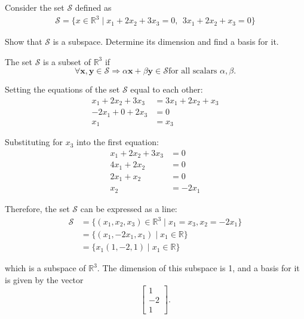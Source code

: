 \begin{homeworkProblem}


    Consider the set $\mathcal S$ defined as
    \[
        \begin{split}
            \mathcal S=\{x\in\mathbb R^3 \;|\; x_1+2x_2+3x_3=0, \ \  3x_1+2x_2+x_3=0\}
        \end{split}
    \]

    Show that $\mathcal S$ is a subspace. Determine its dimension and find a basis for it.
    \\

    \begin{solution}
        The set $\mathcal{S}$ is a subset of $\mathbb{R}^3$ if
        $$\forall \boldsymbol{x}, \boldsymbol{y} \in \mathcal{S} \Rightarrow \alpha 
        \boldsymbol{x} + \beta \boldsymbol{y} \in \mathcal{S} \text{for all scalars }
        \alpha, \beta \text{.}$$

        Setting the equations of the set $\mathcal{S}$ equal to each other:
        \[
            \begin{aligned}
                x_1 + 2x_2 + 3x_3 &= 3x_1 + 2x_2 + x_3 \\
                -2x_1 + 0 + 2x_3 &= 0 \\
                x_1 &= x_3
            \end{aligned}
        \]

        Substituting for \(x_3\) into the first equation:
        \[
            \begin{aligned}
                x_1 + 2x_2 + 3x_3 &= 0 \\
                4x_1 + 2x_2 &= 0 \\
                2x_1 + x_2 &= 0 \\
                x_2 &= -2x_1
            \end{aligned}
        \]

        Therefore, the set $\mathcal{S}$ can be expressed as a line:
        \[
            \begin{aligned}
                \mathcal{S} &= \{(x_1, x_2, x_3) \in \mathbb{R}^3 \mid x_1 = x_3, x_2 = -2x_1\} \\
                &= \{(x_1, -2x_1, x_1) \mid x_1 \in \mathbb{R}\} \\
                &= \{x_1(1, -2, 1) \mid x_1 \in \mathbb{R}\}
            \end{aligned}
        \]

        which is a subspace of $\mathbb{R}^3$. The dimension of this subspace is 1, 
        and a basis for it is given by the vector 
        \[
            \begin{bmatrix}
                1 \\
                -2 \\
                1
            \end{bmatrix}
            \text{.}
        \] 

    \end{solution}

\end{homeworkProblem}